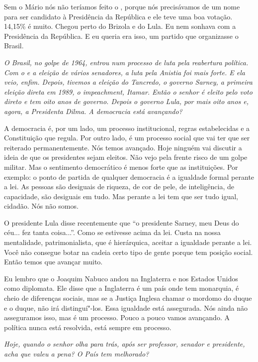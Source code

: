 Sem o Mário nós não teríamos feito o , porque nós precisávamos de um
nome para ser candidato à Presidência da República e ele teve uma boa
votação. 14,15\% é muito. Chegou perto do Brizola e do Lula. Eu nem
sonhava com a Presidência da República. E eu queria era isso, um partido
que organizasse o Brasil.

\medskip

\noindent\emph{O Brasil, no golpe de 1964, entrou num processo de luta pela
reabertura política. Com o  e a eleição de vários senadores, a luta
pela Anistia foi mais forte. E ela veio, enfim. Depois, tivemos a
eleição do Tancredo, o governo Sarney, a primeira eleição direta em
1989, o impeachment, Itamar. Então o senhor é eleito pelo voto direto e
tem oito anos de governo. Depois o governo Lula, por mais oito anos e,
agora, a Presidenta Dilma. A democracia está avançando?}

A democracia é, por um lado, um processo institucional,
regras estabelecidas e a Constituição que regula. Por outro lado, é um
processo social que vai ter que ser reiterado permanentemente. Nós temos
avançado. Hoje ninguém vai discutir a ideia de que os presidentes sejam
eleitos. Não vejo pela frente risco de um golpe militar. Mas o
sentimento democrático é menos forte que as instituições. Por exemplo: o
ponto de partida de qualquer democracia é a igualdade formal perante a
lei. As pessoas são desiguais de riqueza, de cor de pele, de
inteligência, de capacidade, são desiguais em tudo. Mas perante a lei
tem que ser tudo igual, cidadão. Nós não somos.

O presidente Lula disse recentemente que ``o presidente Sarney, meu Deus
do céu... fez tanta coisa...''. Como se estivesse acima da lei. Custa na
nossa mentalidade, patrimonialista, que é hierárquica, aceitar a
igualdade perante a lei. Você não consegue botar na cadeia certo tipo de
gente porque tem posição social. Então temos que avançar muito.

Eu lembro que o Joaquim Nabuco andou na Inglaterra e nos Estados Unidos
como diplomata. Ele disse que a Inglaterra é um país onde tem monarquia,
é cheio de diferenças sociais, mas se a Justiça Inglesa chamar o mordomo
do duque e o duque, não irá distinguí"-los. Essa igualdade está
assegurada. Nós ainda não asseguramos isso, mas é um processo. Pouco a
pouco vamos avançando. A política nunca está resolvida, está sempre em
processo.

\medskip

\noindent\emph{Hoje, quando o senhor olha para trás, após ser professor,
senador e presidente, acha que valeu a pena? O País tem melhorado?}

